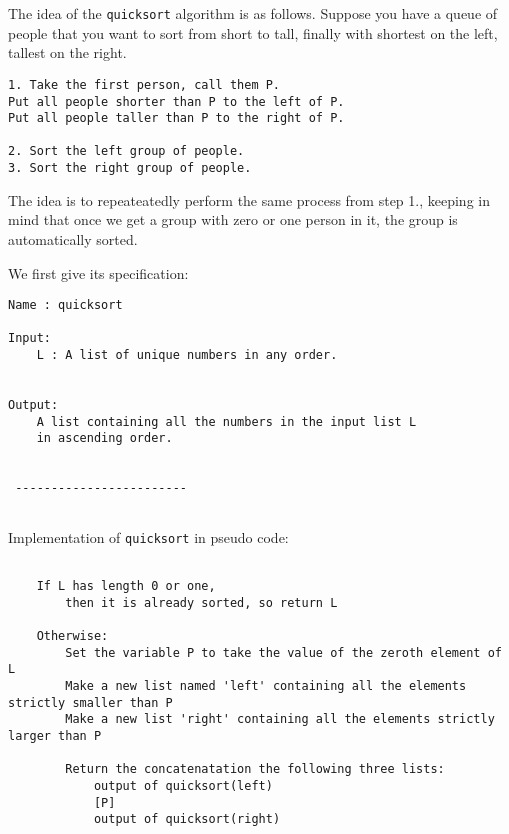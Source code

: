 \documentclass{report}
\begin{document}
The idea of the \texttt{quicksort} algorithm is as follows. Suppose you
have a queue of people that you want to sort from short to tall, finally
with shortest on the left, tallest on the right.

\begin{verbatim}
1. Take the first person, call them P. 
Put all people shorter than P to the left of P. 
Put all people taller than P to the right of P.

2. Sort the left group of people.
3. Sort the right group of people.
\end{verbatim}

The idea is to repeateatedly perform the same process from step 1.,
keeping in mind that once we get a group with zero or one person in it,
the group is automatically sorted.

We first give its specification:

\begin{verbatim}
Name : quicksort

Input:
    L : A list of unique numbers in any order.
    
    
Output:
    A list containing all the numbers in the input list L
    in ascending order.
    
    
 ------------------------
        
\end{verbatim}

Implementation of \texttt{quicksort} in pseudo code:

\begin{verbatim}

    If L has length 0 or one, 
        then it is already sorted, so return L

    Otherwise:
        Set the variable P to take the value of the zeroth element of L        
        Make a new list named 'left' containing all the elements strictly smaller than P        
        Make a new list 'right' containing all the elements strictly larger than P
        
        Return the concatenatation the following three lists:
            output of quicksort(left)
            [P]
            output of quicksort(right)
        

\end{verbatim}
\end{document}

